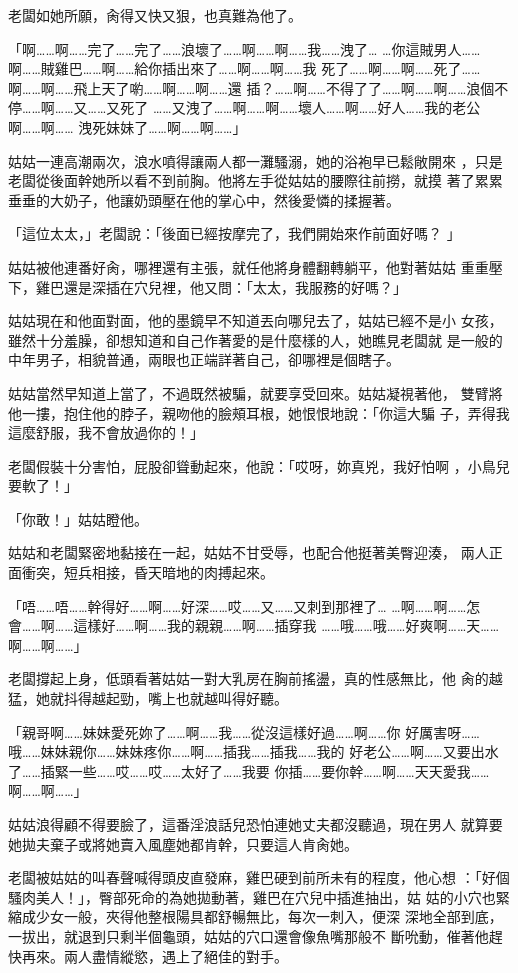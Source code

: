 老闆如她所願，肏得又快又狠，也真難為他了。

「啊……啊……完了……完了……浪壞了……啊……啊……我……洩了…
…你這賊男人……啊……賊雞巴……啊……給你插出來了……啊……啊……我
死了……啊……啊……死了……啊……啊……飛上天了喲……啊……啊……還
插？……啊……不得了了……啊……啊……浪個不停……啊……又……又死了
……又洩了……啊……啊……壞人……啊……好人……我的老公啊……啊……
洩死妹妹了……啊……啊……」

姑姑一連高潮兩次，浪水噴得讓兩人都一灘騷溺，她的浴袍早已鬆敞開來
，只是老闆從後面幹她所以看不到前胸。他將左手從姑姑的腰際往前撈，就摸
著了累累垂垂的大奶子，他讓奶頭壓在他的掌心中，然後愛憐的揉握著。

「這位太太，」老闆說：「後面已經按摩完了，我們開始來作前面好嗎？
」

姑姑被他連番好肏，哪裡還有主張，就任他將身體翻轉躺平，他對著姑姑
重重壓下，雞巴還是深插在穴兒裡，他又問：「太太，我服務的好嗎？」

姑姑現在和他面對面，他的墨鏡早不知道丟向哪兒去了，姑姑已經不是小
女孩，雖然十分羞臊，卻想知道和自己作著愛的是什麼樣的人，她瞧見老闆就
是一般的中年男子，相貌普通，兩眼也正端詳著自己，卻哪裡是個瞎子。

姑姑當然早知道上當了，不過既然被騙，就要享受回來。姑姑凝視著他，
雙臂將他一摟，抱住他的脖子，親吻他的臉頰耳根，她恨恨地說：「你這大騙
子，弄得我這麼舒服，我不會放過你的！」

老闆假裝十分害怕，屁股卻聳動起來，他說：「哎呀，妳真兇，我好怕啊
，小鳥兒要軟了！」

「你敢！」姑姑瞪他。

姑姑和老闆緊密地黏接在一起，姑姑不甘受辱，也配合他挺著美臀迎湊，
兩人正面衝突，短兵相接，昏天暗地的肉搏起來。

「唔……唔……幹得好……啊……好深……哎……又……又刺到那裡了…
…啊……啊……怎會……啊……這樣好……啊……我的親親……啊……插穿我
……哦……哦……好爽啊……天……啊……啊……」

老闆撐起上身，低頭看著姑姑一對大乳房在胸前搖盪，真的性感無比，他
肏的越猛，她就抖得越起勁，嘴上也就越叫得好聽。

「親哥啊……妹妹愛死妳了……啊……我……從沒這樣好過……啊……你
好厲害呀……哦……妹妹親你……妹妹疼你……啊……插我……插我……我的
好老公……啊……又要出水了……插緊一些……哎……哎……太好了……我要
你插……要你幹……啊……天天愛我……啊……啊……」

姑姑浪得顧不得要臉了，這番淫浪話兒恐怕連她丈夫都沒聽過，現在男人
就算要她拋夫棄子或將她賣入風塵她都肯幹，只要這人肯肏她。

老闆被姑姑的叫春聲喊得頭皮直發麻，雞巴硬到前所未有的程度，他心想
：「好個騷肉美人！」，臀部死命的為她拋動著，雞巴在穴兒中插進抽出，姑
姑的小穴也緊縮成少女一般，夾得他整根陽具都舒暢無比，每次一刺入，便深
深地全部到底，一拔出，就退到只剩半個龜頭，姑姑的穴口還會像魚嘴那般不
斷吮動，催著他趕快再來。兩人盡情縱慾，遇上了絕佳的對手。

